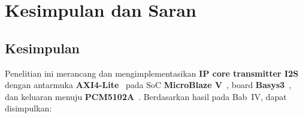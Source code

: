 \chapter{Kesimpulan dan Saran}

\section{Kesimpulan}

Penelitian ini merancang dan mengimplementasikan \textbf{IP core transmitter I2S}~\citep{philips_i2s_1986} dengan antarmuka \textbf{AXI4-Lite}~\citep{arm_amba_axi_2010} pada SoC \textbf{MicroBlaze V}~\citep{xilinx_microblaze_ref_2021}, board \textbf{Basys3}~\citep{xilinx_basys3_ref}, dan keluaran menuju \textbf{PCM5102A}~\citep{pcm5102a_datasheet}. Berdasarkan hasil pada Bab~IV, dapat disimpulkan:


